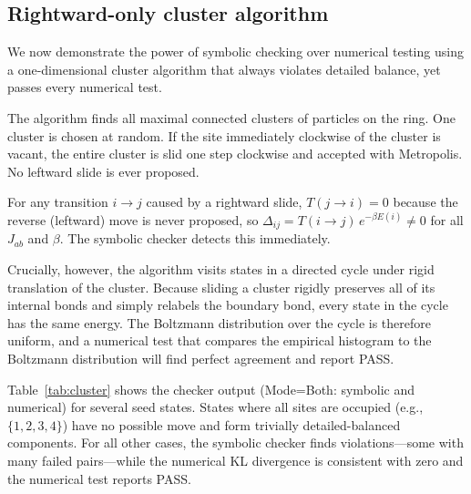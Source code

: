 \documentclass[twocolumn,10pt]{article}
\begin{document}
\subsection{Rightward-only cluster algorithm}
\label{sec:cluster}

We now demonstrate the power of symbolic checking over numerical testing using
a one-dimensional cluster algorithm that always violates detailed balance, yet
passes every numerical test.

The algorithm finds all maximal connected clusters of particles on the ring.
One cluster is chosen at random.  If the site immediately clockwise of the
cluster is vacant, the entire cluster is slid one step clockwise and accepted
with Metropolis.  No leftward slide is ever proposed.

For any transition $i\to j$ caused by a rightward slide, $T(j\to i)=0$
because the reverse (leftward) move is never proposed, so
$\Delta_{ij} = T(i\to j)\,e^{-\beta E(i)}\neq 0$ for all $J_{ab}$ and
$\beta$.  The symbolic checker detects this immediately.

Crucially, however, the algorithm visits states in a directed cycle under
rigid translation of the cluster.  Because sliding a cluster rigidly preserves
all of its internal bonds and simply relabels the boundary bond, every state in
the cycle has the same energy.  The Boltzmann distribution over the cycle is
therefore uniform, and a numerical test that compares the empirical histogram
to the Boltzmann distribution will find perfect agreement and report PASS.

Table~\ref{tab:cluster} shows the checker output (Mode=Both: symbolic and
numerical) for several seed states.  States where all sites are occupied
(e.g., $\{1,2,3,4\}$) have no possible move and form trivially
detailed-balanced components.  For all other cases, the symbolic checker finds
violations---some with many failed pairs---while the numerical KL divergence
is consistent with zero and the numerical test reports PASS.
\end{document}
